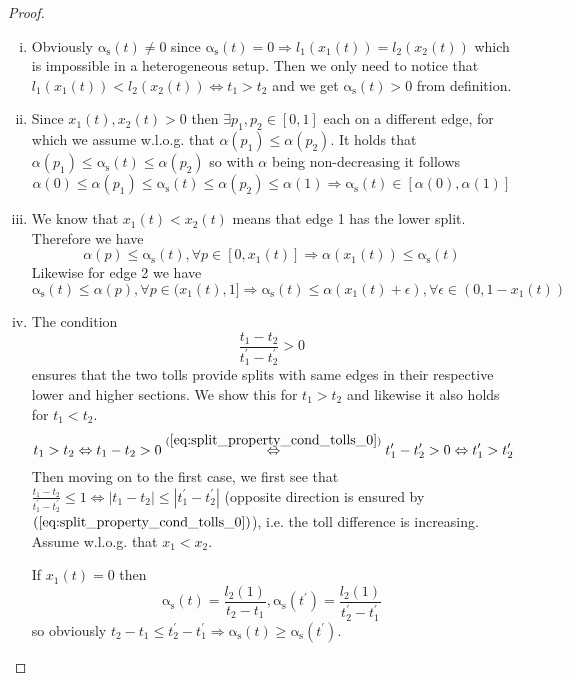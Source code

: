 \documentclass[a4paper,11pt]{article}
\newcommand{\LeftrightarrowArg}[1]{\stackrel{#1}{\Leftrightarrow}}
\newcommand{\as}{\mathrm{\alpha_s}}
\begin{document}
\begin{proof}
	$ $ %
	\begin{enumerate}[(i)]
		\item Obviously $\as(t) \ne 0$ since $\as(t) = 0 \Rightarrow l_1(x_1(t)) = l_2(x_2(t))$ which is impossible in a heterogeneous setup.
		Then we only need to notice that $l_1(x_1(t)) < l_2(x_2(t)) \iff t_1 > t_2$ and we get $\as(t) > 0$ from definition.
		\item Since $x_1(t), x_2(t) > 0$ then $\exists p_1, p_2 \in [0, 1]$ each on a different edge, for which we assume w.l.o.g. that $\alpha(p_1) \le \alpha(p_2)$.
		It holds that $\alpha(p_1) \le \as(t) \le \alpha(p_2)$ so with $\alpha$ being non-decreasing it follows
		\[\alpha(0) \le \alpha(p_1) \le \as(t) \le \alpha(p_2) \le \alpha(1) \Rightarrow \as(t) \in [\alpha(0), \alpha(1)]\]
		\item We know that $x_1(t) < x_2(t)$ means that edge 1 has the lower split.
		Therefore we have
		\[\alpha(p) \le \as(t), \forall p \in [0, x_1(t)] \Rightarrow \alpha(x_1(t)) \le \as(t)\]
		Likewise for edge 2 we have
		\[\as(t) \le \alpha(p), \forall p \in (x_1(t), 1] \Rightarrow \as(t) \le \alpha(x_1(t) + \epsilon), \forall \epsilon \in (0, 1 - x_1(t))\]
		\item The condition
		\begin{equation}
			\frac{t_1 - t_2}{t_1^\prime - t_2^\prime} > 0
			\label{eq:split_property_cond_tolls_0}
		\end{equation}
		ensures that the two tolls provide splits with same edges in their respective lower and higher sections.
		We show this for $t_1 > t_2$ and likewise it also holds for $t_1 < t_2$.
		\[t_1 > t_2 \Leftrightarrow t_1 - t_2 > 0 \LeftrightarrowArg{(\ref{eq:split_property_cond_tolls_0})} t_1^\prime - t_2^\prime > 0 \Leftrightarrow t_1^\prime > t_2^\prime\]
		Then moving on to the first case, we first see that $\frac{t_1 - t_2}{t_1^\prime - t_2^\prime} \le 1 \Leftrightarrow |t_1 - t_2| \le |t_1^\prime - t_2^\prime|$ (opposite direction is ensured by $(\ref{eq:split_property_cond_tolls_0})$), i.e. the toll difference is increasing.
		Assume w.l.o.g. that $x_1 < x_2$.
		
		If $x_1(t) = 0$ then
		\[\as(t) = \frac{l_2(1)}{t_2 - t_1}, \as(t^\prime) = \frac{l_2(1)}{t_2^\prime - t_1^\prime}\] 
		so obviously $t_2 - t_1 \le t_2^\prime - t_1^\prime \Rightarrow \as(t) \ge \as(t^\prime)$.
		

\end{enumerate}
\end{proof}
\end{document}
